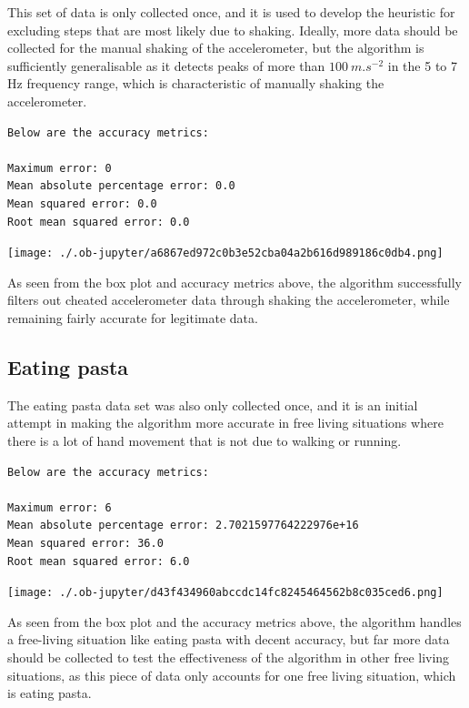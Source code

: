 \documentclass[12pt]{report}
\begin{document}
This set of data is only collected once, and it is used to develop
the heuristic for excluding steps that are most likely due to
shaking. Ideally, more data should be collected for the manual
shaking of the accelerometer, but the algorithm is
sufficiently generalisable as it detects peaks of more than
\(\qty{100}{m.s^{-2}}\) in the 5 to 7 Hz frequency range,
which is characteristic of manually shaking the accelerometer.

\clearpage

\label{org7c7cff1}
\begin{verbatim}
Below are the accuracy metrics:

Maximum error: 0
Mean absolute percentage error: 0.0
Mean squared error: 0.0
Root mean squared error: 0.0
\end{verbatim}

\begin{center}
\texttt{[image: ./.ob-jupyter/a6867ed972c0b3e52cba04a2b616d989186c0db4.png]}
\end{center}

As seen from the box plot and accuracy metrics above,
the algorithm successfully filters out cheated accelerometer data
through shaking the accelerometer,
while remaining fairly accurate for legitimate data.
\subsection{Eating pasta}
\label{sec:orga603050}
The eating pasta data set was also only collected once, and it is an
initial attempt in making the algorithm more accurate in free living
situations where there is a lot of hand movement that is not due to
walking or running.
\label{org6ad30e2}
\begin{verbatim}
Below are the accuracy metrics:

Maximum error: 6
Mean absolute percentage error: 2.7021597764222976e+16
Mean squared error: 36.0
Root mean squared error: 6.0
\end{verbatim}

\begin{center}
\texttt{[image: ./.ob-jupyter/d43f434960abccdc14fc8245464562b8c035ced6.png]}
\end{center}

As seen from the box plot and the accuracy metrics above,
the algorithm handles a free-living situation like eating pasta
with decent accuracy, but far more data should be collected
to test the effectiveness of the algorithm in other
free living situations, as this piece of data only accounts for
one free living situation, which is eating pasta.
\end{document}
